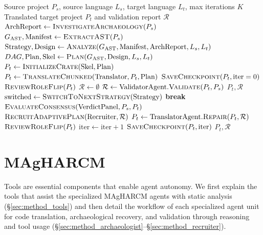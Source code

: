 \begin{algorithm}
\label{alg:magharcm_pipeline}
\begin{algorithmic}[1]
\Input Source project $P_s$, source language $L_s$, target language $L_t$, max iterations $K$
\Output Translated target project $P_t$ and validation report $\mathcal{R}$
\StateIndent $\text{ArchReport} \gets \textsc{InvestigateArchaeology}(P_s)$ 
\StateIndent $G_{\text{AST}}, \text{Manifest} \gets \textsc{ExtractAST}(P_s)$
\StateIndent $\text{Strategy}, \text{Design} \gets \textsc{Analyze}(G_{\text{AST}}, \text{Manifest}, \text{ArchReport}, L_s, L_t)$
\StateIndent $DAG, \text{Plan}, \text{Skel} \gets \textsc{Plan}(G_{\text{AST}}, \text{Design}, L_s, L_t)$
\StateIndent $P_t \gets \textsc{InitializeCrate}(\text{Skel}, \text{Plan})$
\StateIndent $P_t \gets \textsc{TranslateChunked}(\text{Translator}, P_t, \text{Plan})$
\StateIndent $\textsc{SaveCheckpoint}(P_t, \text{iter}=0)$
\StateIndent $\textsc{ReviewRoleFlip}(P_t)$ 
\StateIndent $\mathcal{R} \gets \emptyset$
    \StateDIndent $\mathcal{R} \gets \text{ValidatorAgent}.\textsc{Validate}(P_t, P_s)$
        \StateTIndent \Return $P_t, \mathcal{R}$ 
    \EndIfIndent
        \StateTIndent $\text{switched} \gets \textsc{SwitchToNextStrategy}(\text{Strategy})$ 
         \textbf{break} \EndIfIndent
    \EndIfIndent
    \StateDIndent $\textsc{EvaluateConsensus}(\text{VerdictPanel}, P_s, P_t)$ 
    \StateDIndent $\textsc{RecruitAdaptivePlan}(\text{Recruiter}, \mathcal{R})$ 
    \StateDIndent $P_t \gets \text{TranslatorAgent}.\textsc{Repair}(P_t, \mathcal{R})$
    \StateDIndent $\textsc{ReviewRoleFlip}(P_t)$
    \StateDIndent $\text{iter} \gets \text{iter} + 1$
    \StateDIndent $\textsc{SaveCheckpoint}(P_t, \text{iter})$
\EndWhile
\StateIndent \Return $P_t, \mathcal{R}$
\end{algorithmic}
\end{algorithm}

\section{MAgHARCM}
\label{sec:method_magharcm}

Tools are essential components that enable agent autonomy. We first
explain the tools that assist the specialized MAgHARCM agents with static
analysis (§\ref{sec:method_tools}) and then detail the workflow of each
specialized agent unit for code translation, archaeological recovery,
and validation through reasoning and tool usage
(§\ref{sec:method_archaeologist}--§\ref{sec:method_recruiter}).

